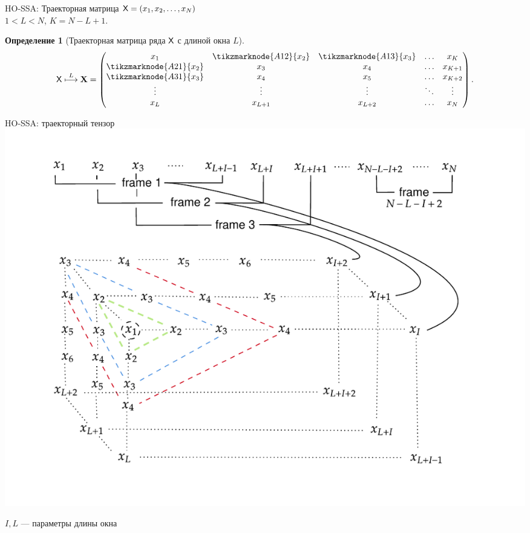 \documentclass[pdf, unicode, 9pt, notheorems, handout]{beamer}
\newtheorem{definition}{Определение}
\begin{document}
\begin{frame}{HO-SSA: Траекторная матрица}
  $\mathsf{X} = \left(x_1, x_2, \ldots, x_N\right)$\\ \vspace{0.1cm}
  $1 < L < N$, $K=N-L+1$.
  \vspace{0.2cm}
  \begin{definition}[Траекторная матрица ряда $\mathsf{X}$ с длиной окна $L$]
    \[
      \tX \stackrel{L}{\longmapsto} \bfX =
      \begin{pmatrix}
        x_1                     & \tikzmarknode{A12}{x_2} &
        \tikzmarknode{A13}{x_3} & \ldots & x_K     \\
        \tikzmarknode{A21}{x_2} & x_3                     & x_4
        & \ldots & x_{K+1} \\
        \tikzmarknode{A31}{x_3} & x_4                     & x_5
        & \ldots & x_{K+2} \\
        \vdots                  & \vdots                  & \vdots
        & \ddots & \vdots  \\
        x_L                     & x_{L+1}                 & x_{L+2}
        & \ldots & x_N
      \end{pmatrix}.
    \]
  \end{definition}
\end{frame}

\begin{frame}{HO-SSA: траекторный тензор}
  \centering
  \includegraphics[width = \textwidth]{../img/tens-injection-wide}\\{}
  \vspace{-0.4cm}

  $I, L$ --- параметры длины окна
\end{frame}
\end{document}
